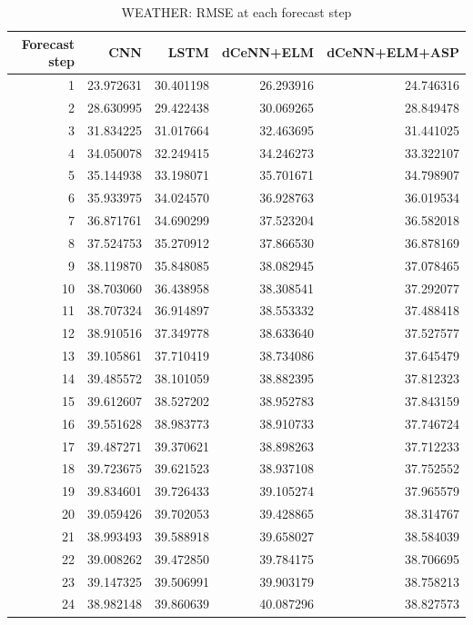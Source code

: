 \begin{table}
\caption{WEATHER: RMSE at each forecast step}
\begin{tabular}{rrrrr}
\toprule
Forecast step & CNN & LSTM & dCeNN+ELM & dCeNN+ELM+ASP \\
\midrule
1 & 23.972631 & 30.401198 & 26.293916 & 24.746316 \\
2 & 28.630995 & 29.422438 & 30.069265 & 28.849478 \\
3 & 31.834225 & 31.017664 & 32.463695 & 31.441025 \\
4 & 34.050078 & 32.249415 & 34.246273 & 33.322107 \\
5 & 35.144938 & 33.198071 & 35.701671 & 34.798907 \\
6 & 35.933975 & 34.024570 & 36.928763 & 36.019534 \\
7 & 36.871761 & 34.690299 & 37.523204 & 36.582018 \\
8 & 37.524753 & 35.270912 & 37.866530 & 36.878169 \\
9 & 38.119870 & 35.848085 & 38.082945 & 37.078465 \\
10 & 38.703060 & 36.438958 & 38.308541 & 37.292077 \\
11 & 38.707324 & 36.914897 & 38.553332 & 37.488418 \\
12 & 38.910516 & 37.349778 & 38.633640 & 37.527577 \\
13 & 39.105861 & 37.710419 & 38.734086 & 37.645479 \\
14 & 39.485572 & 38.101059 & 38.882395 & 37.812323 \\
15 & 39.612607 & 38.527202 & 38.952783 & 37.843159 \\
16 & 39.551628 & 38.983773 & 38.910733 & 37.746724 \\
17 & 39.487271 & 39.370621 & 38.898263 & 37.712233 \\
18 & 39.723675 & 39.621523 & 38.937108 & 37.752552 \\
19 & 39.834601 & 39.726433 & 39.105274 & 37.965579 \\
20 & 39.059426 & 39.702053 & 39.428865 & 38.314767 \\
21 & 38.993493 & 39.588918 & 39.658027 & 38.584039 \\
22 & 39.008262 & 39.472850 & 39.784175 & 38.706695 \\
23 & 39.147325 & 39.506991 & 39.903179 & 38.758213 \\
24 & 38.982148 & 39.860639 & 40.087296 & 38.827573 \\
\bottomrule
\end{tabular}
\end{table}
